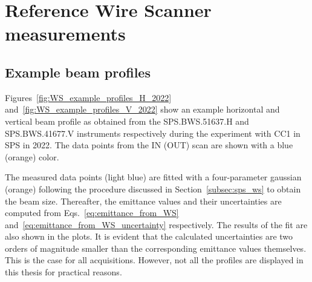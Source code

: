 \section{Reference Wire Scanner measurements}\label{sec:sps_transverse_beam_profiles}
\subsection{Example beam profiles}
Figures~\ref{fig:WS_example_profiles_H_2022} and~\ref{fig:WS_example_profiles_V_2022} show an example horizontal and vertical beam profile as obtained from the SPS.BWS.51637.H and SPS.BWS.41677.V instruments respectively during the experiment with CC1 in SPS in 2022. The data points from the IN (OUT) scan are shown with a blue (orange) color. 

The measured data points (light blue) are fitted with a four-parameter gaussian (orange) following the procedure discussed in Section~\ref{subsec:sps_ws} to obtain the beam size. Thereafter, the emittance values and their uncertainties are computed from Eqs.~\eqref{eq:emittance_from_WS} and~\eqref{eq:emittance_from_WS_uncertainty} respectively. The results of the fit are also shown in the plots. It is evident that the calculated uncertainties are two orders of magnitude smaller than the corresponding emittance values themselves. This is the case for all acquisitions. However, not all the profiles are displayed in this thesis for practical reasons.

